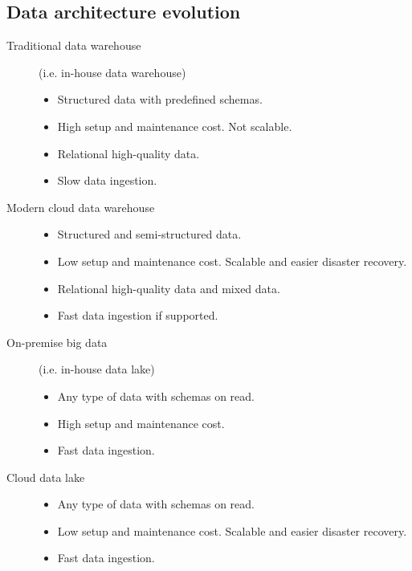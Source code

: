 \subsection{Data architecture evolution}
\begin{description}
    \item[Traditional data warehouse]  
        (i.e. in-house data warehouse)
        \begin{itemize}
            \item Structured data with predefined schemas.
            \item High setup and maintenance cost. Not scalable.
            \item Relational high-quality data.
            \item Slow data ingestion.
        \end{itemize}

    \item[Modern cloud data warehouse]  
        \phantom{}
        \begin{itemize}
            \item Structured and semi-structured data.
            \item Low setup and maintenance cost. Scalable and easier disaster recovery.
            \item Relational high-quality data and mixed data.
            \item Fast data ingestion if supported.
        \end{itemize}

    \item[On-premise big data]  
        (i.e. in-house data lake)
        \begin{itemize}
            \item Any type of data with schemas on read.
            \item High setup and maintenance cost.
            \item Fast data ingestion.
        \end{itemize}

    \item[Cloud data lake]  
        \phantom{}
        \begin{itemize}
            \item Any type of data with schemas on read.
            \item Low setup and maintenance cost. Scalable and easier disaster recovery.
            \item Fast data ingestion.
        \end{itemize}
\end{description}


